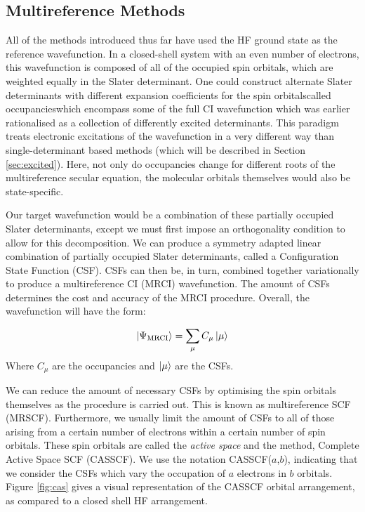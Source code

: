 \subsection{Multireference Methods}
\label{sec:multiref}
All of the methods introduced thus far have used the HF ground state as the reference wavefunction. In a closed-shell system with an even number of electrons, this wavefunction is composed of all of the occupied spin orbitals, which are weighted equally in the Slater determinant. One could construct alternate Slater determinants with different expansion coefficients for the spin orbitals\textemdash{}called occupancies\textemdash{}which encompass some of the full CI wavefunction which was earlier rationalised as a collection of differently excited determinants. This paradigm treats electronic excitations of the wavefunction in a very different way than single-determinant based methods (which will be described in Section \ref{sec:excited}). Here, not only do occupancies change for different roots of the multireference secular equation, the molecular orbitals themselves would also be state-specific.

Our target wavefunction would be a combination of these partially occupied Slater determinants, except we must first impose an orthogonality condition to allow for this decomposition. We can produce a symmetry adapted linear combination of partially occupied Slater determinants, called a Configuration State Function (CSF). CSFs can then be, in turn, combined together variationally to produce a multireference CI (MRCI) wavefunction. The amount of CSFs determines the cost and accuracy of the MRCI procedure. Overall, the wavefunction will have the form:

\begin{equation}
    \ket{\Psi_{\text{MRCI}}} = \sum_{\mu} C_{\mu} \ket{\mu}
\end{equation}
Where $C_{\mu}$ are the occupancies and $\ket{\mu}$ are the CSFs.\cite{Almlof1981}

We can reduce the amount of necessary CSFs by optimising the spin orbitals themselves as the procedure is carried out. This is known as multireference SCF (MRSCF). Furthermore, we usually limit the amount of CSFs to all of those arising from a certain number of electrons within a certain number of spin orbitals. These spin orbitals are called the \textit{active space} and the method, Complete Active Space SCF (CASSCF).\cite{Roos1980,Siegbahn1981,Roos2007} We use the notation CASSCF($a$,$b$), indicating that we consider the CSFs which vary the occupation of $a$ electrons in $b$ orbitals. Figure \ref{fig:cas} gives a visual representation of the CASSCF orbital arrangement, as compared to a closed shell HF arrangement.

